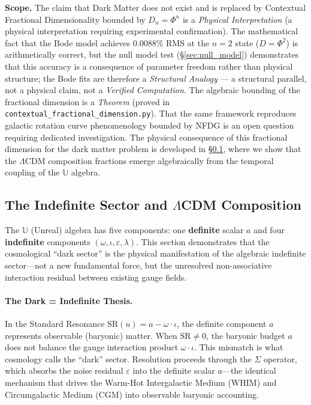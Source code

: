 \textbf{Scope.} The claim that Dark Matter does not exist and is replaced by Contextual Fractional Dimensionality bounded by $D_n = \Phi^n$ is a \emph{Physical Interpretation} (a physical interpretation requiring experimental confirmation). The mathematical fact that the Bode model achieves $0.0088\%$ RMS at the $n=2$ state ($D = \Phi^2$) is arithmetically correct, but the null model test (\S\ref{sec:null_model}) demonstrates that this accuracy is a consequence of parameter freedom rather than physical structure; the Bode fits are therefore a \emph{Structural Analogy} --- a structural parallel, not a physical claim, not a \emph{Verified Computation}. The algebraic bounding of the fractional dimension is a \emph{Theorem} (proved in \texttt{contextual\_fractional\_dimension.py}). That the same framework reproduces galactic rotation curve phenomenology bounded by NFDG is an open question requiring dedicated investigation. The physical consequence of this fractional dimension for the dark matter problem is developed in \S\ref{sec:indefinite_sector}, where we show that the $\Lambda$CDM composition fractions emerge algebraically from the temporal coupling of the $\mathbb{U}$ algebra.

\subsection{The Indefinite Sector and $\Lambda$CDM Composition}\label{sec:indefinite_sector}

The $\mathbb{U}$ (Unreal) algebra has five components: one \textbf{definite} scalar $a$ and four \textbf{indefinite} components $(\omega, \iota, \varepsilon, \lambda)$. This section demonstrates that the cosmological ``dark sector'' is the physical manifestation of the algebraic indefinite sector---not a new fundamental force, but the unresolved non-associative interaction residual between existing gauge fields.

\paragraph{The Dark = Indefinite Thesis.}
In the Standard Resonance $\mathrm{SR}(u) = a - \omega \cdot \iota$, the definite component $a$ represents observable (baryonic) matter. When $\mathrm{SR} \neq 0$, the baryonic budget $a$ does not balance the gauge interaction product $\omega \cdot \iota$. This mismatch is what cosmology calls the ``dark'' sector. Resolution proceeds through the $\Sigma$ operator, which absorbs the noise residual $\varepsilon$ into the definite scalar $a$---the identical mechanism that drives the Warm-Hot Intergalactic Medium (WHIM) and Circumgalactic Medium (CGM) into observable baryonic accounting.

